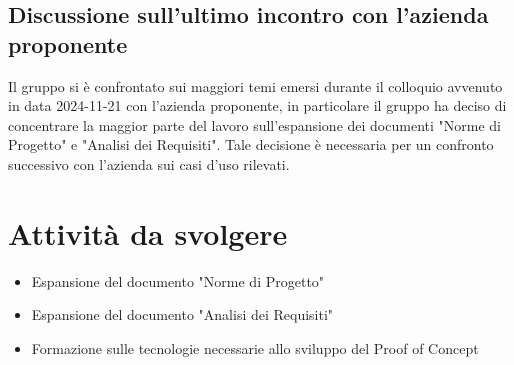 \documentclass[10pt]{article}
\begin{document}
    \subsection{Discussione sull'ultimo incontro con l'azienda proponente}
    Il gruppo si è confrontato sui maggiori temi emersi durante il colloquio avvenuto in data 2024-11-21 con l'azienda proponente, in particolare il gruppo ha deciso di concentrare la maggior parte del lavoro sull'espansione dei documenti "Norme di Progetto" e "Analisi dei Requisiti".
    Tale decisione è necessaria per un confronto successivo con l'azienda sui casi d'uso rilevati.

    \section{Attività da svolgere}
    \begin{itemize}
        \item Espansione del documento "Norme di Progetto"
        \item Espansione del documento "Analisi dei Requisiti"
        \item Formazione sulle tecnologie necessarie allo sviluppo del Proof of Concept
    \end{itemize}



     
\end{document}
